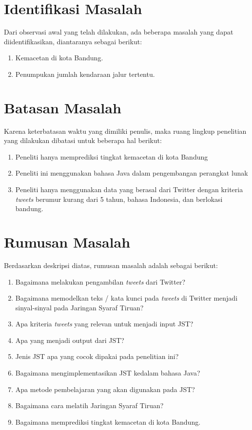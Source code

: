 \section{Identifikasi Masalah}
Dari observasi awal yang telah dilakukan, ada beberapa masalah yang dapat diidentifikasikan, diantaranya sebagai berikut:
\begin{enumerate}
	\item Kemacetan di kota Bandung.
	\item Penumpukan jumlah kendaraan jalur tertentu.
\end{enumerate}

\section{Batasan Masalah}
Karena keterbatasan waktu yang dimiliki penulis, maka ruang lingkup penelitian yang dilakukan dibatasi untuk beberapa hal berikut:
\begin{enumerate}
	\item Peneliti hanya memprediksi tingkat kemacetan di kota Bandung
	\item Peneliti ini menggunakan bahasa Java dalam pengembangan perangkat lunak
	\item Peneliti hanya menggunakan data yang berasal dari Twitter dengan kriteria \textit{tweets} berumur kurang dari 5 tahun, bahasa Indonesia, dan berlokasi bandung.
\end{enumerate}
\section{Rumusan Masalah}
Berdasarkan deskripsi diatas, rumusan masalah adalah sebagai berikut:
\begin{enumerate}
	\item Bagaimana melakukan pengambilan \textit{tweets} dari Twitter?
	\item Bagaimana memodelkan teks / kata kunci pada \textit{tweets} di Twitter menjadi sinyal-sinyal pada Jaringan
Syaraf Tiruan?
	\item Apa kriteria \textit{tweets} yang relevan untuk menjadi input JST?
	\item Apa yang menjadi output dari JST?
	\item Jenis JST apa yang cocok dipakai pada penelitian ini?
	\item Bagaimana mengimplementasikan JST kedalam bahasa Java?
	\item Apa metode pembelajaran yang akan digunakan pada JST?
	\item Bagaimana cara melatih Jaringan Syaraf Tiruan?
	\item Bagaimana memprediksi tingkat kemacetan di kota Bandung.
\end{enumerate}

